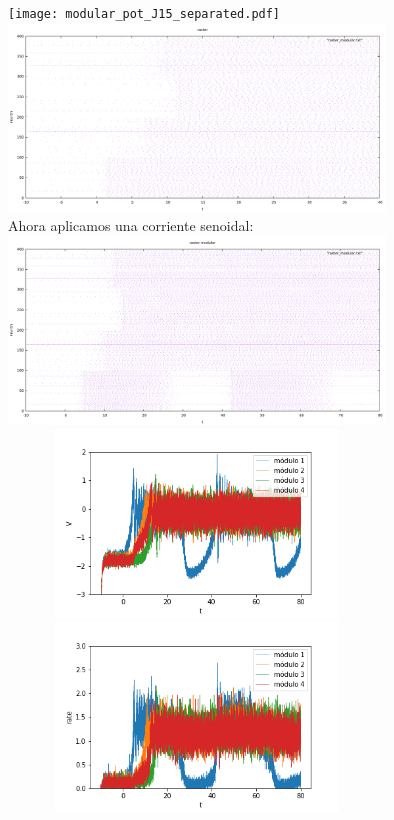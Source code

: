 \documentclass[a4paper]{article}
\begin{document}
\texttt{[image: modular\_pot\_J15\_separated.pdf]}\\
\includegraphics[width=10cm,height=5cm]{modular_raster_J15_separated.pdf}\\
Ahora aplicamos una corriente senoidal:\\
\includegraphics[width=10cm,height=5cm]{modular_raster_J15_separated_sin.pdf}\\
\includegraphics[width=10cm,height=5cm]{potencial_seno_modulos.png}\\
\includegraphics[width=10cm,height=5cm]{rate_seno_modulos.png}\\
\end{document}
